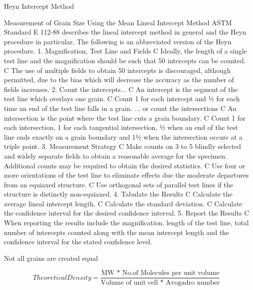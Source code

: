 \documentclass[10pt]{beamer}
\begin{document}
{\begin{frame}[fragile]{Heyn Intercept Method}
							
							Measurement of Grain Size Using the Mean Lineal Intercept Method
ASTM Standard E 112-88 describes the lineal intercept method in general and the Heyn procedure
in particular. The following is an abbreviated version of the Heyn procedure.
1. Magnification, Test Line and Fields
C Ideally, the length of a single test line and the magnification should be such that 50 intercepts
can be counted.
C The use of multiple fields to obtain 50 intercepts is discouraged, although permitted, due to the
bias which will decrease the accuracy as the number of fields increases.
2. Count the intercepts...
C An intercept is the segment of the test line which overlays one grain.
C Count 1 for each intercept and ½ for each time an end of the test line falls in a grain.
... or count the intersections
C An intersection is the point where the test line cuts a grain boundary.
C Count 1 for each intersection, 1 for each tangential intersection, ½ when an end of the test line
ends exactly on a grain boundary and 1½ when the intersection occurs at a triple point.
3. Measurement Strategy
C Make counts on 3 to 5 blindly selected and widely separate fields to obtain a reasonable average
for the specimen. Additional counts may be required to obtain the desired statistics.
C Use four or more orientations of the test line to eliminate effects due the moderate departures
from an equiaxed structure.
C Use orthogonal sets of parallel test lines if the structure is distinctly non-equiaxed.
4. Tabulate the Results
C Calculate the average lineal intercept length.
C Calculate the standard deviation.
C Calculate the confidence interval for the desired confidence interval.
5. Report the Results
C When reporting the results include the magnification, length of the test line, total number of
intercepts counted along with the mean intercept length and the confidence interval for the stated
confidence level.
    
\end{frame}
}


{%
\begin{frame}[fragile]{Not all grains are created equal}

\begin{equation*}
Theoretical Density = \dfrac{\text{MW * No.of Molecules per unit volume}}{\text{Volume of unit cell * Avogadro number}}
\end{equation*}   
    
\end{frame}
}
\end{document}
